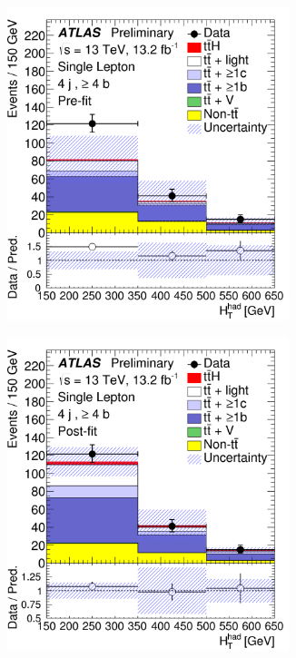 \begin{figure}[htbp!]
\begin{subfigure}{0.24\textwidth}
  \caption{}
  \label{}
\end{subfigure}
\begin{subfigure}{0.24\textwidth}
  \centering
  \includegraphics[width=0.9\textwidth]{figures/ttH/fig_07e.png}
  \caption{}
  \label{}
\end{subfigure}
\begin{subfigure}{0.24\textwidth}
  \centering
  \includegraphics[width=0.9\textwidth]{figures/ttH/fig_07f.png}

\end{subfigure}
\end{figure}
